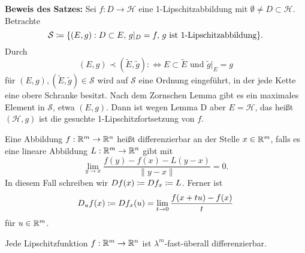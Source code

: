 \documentclass[a4paper,twoside,DIV15,BCOR12mm]{scrbook}
\newcommand{\HR}{\mathcal H}
\begin{document}
\begin{beweis}
\textbf{Beweis des Satzes:}
Sei $f:D \to \HR$ eine 1-Lipschitzabbildung mit $\emptyset \ne D \subset \HR$. Betrachte
\[
\mathcal S \da \{(E,g) : D\subset E,\, g|_D = f,\, g\text{ ist 1-Lipschitzabbildung}\}.
\]
Durch 
\[
(E,g)\prec(\tilde E, \tilde g) :\iff E\subset \tilde E \text{ und } \tilde g|_E = g
\]
für $(E,g),(\tilde E,\tilde g)\in \mathcal S$ wird auf $\mathcal S$ eine Ordnung eingeführt, in der jede Kette eine obere Schranke besitzt. Nach dem Zornschen Lemma gibt es ein maximales Element in $\mathcal S$, etwa $(E,g)$. Dann ist wegen Lemma D aber $E=\HR$, das heißt $(\HR,g)$ ist die gesuchte 1-Lipschitzfortsetzung von $f$.
\end{beweis}

Eine Abbildung $f:\mathbb{R}^m \to \mathbb{R}^n$ heißt differenzierbar an der Stelle $x\in\mathbb{R}^m$, falls es eine lineare Abbildung $L:\mathbb{R}^m\to\mathbb{R}^n$ gibt mit
\[
\lim_{y\to x} \frac{f(y)-f(x)- L(y-x)}{\|y-x\|} = 0.
\]
In diesem Fall schreiben wir $Df(x) \da Df_x \da L$. Ferner ist
\[
 D_uf(x)\da Df_x(u) = \lim_{t\to0}\frac{f(x+tu) - f(x)}{t}
\]
für $u\in\mathbb{R}^m$.



\begin{satz}[Rademacher]
Jede Lipschitzfunktion $f:\mathbb{R}^m \to \mathbb{R}^n$ ist $\lambda^m$-fast-überall differenzierbar.
\end{satz}
\end{document}
